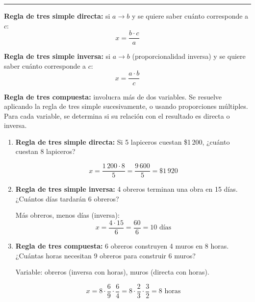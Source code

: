 \documentclass[11pt, letterpaper]{article}
\newcommand{\subbloque}[1]{%
  \vspace{14pt}
  \noindent{\large\bfseries\color{zenitnavy} #1}\par
  \vspace{4pt}\hrule height 1pt\vspace{8pt}}
\begin{document}
\subbloque{6.4 Regla de tres}
\label{sub:6.4}

\begin{tcolorbox}[importantbox, title={Regla de tres}]
\noindent\textbf{Regla de tres simple directa:} si $a \to b$ y se quiere saber cu\'anto corresponde a $c$:
$$x = \frac{b \cdot c}{a}$$

\medskip

\noindent\textbf{Regla de tres simple inversa:} si $a \to b$ (proporcionalidad inversa) y se quiere saber cu\'anto corresponde a $c$:
$$x = \frac{a \cdot b}{c}$$

\medskip

\noindent\textbf{Regla de tres compuesta:} involucra m\'as de dos variables. Se resuelve aplicando la regla de tres simple sucesivamente, o usando proporciones m\'ultiples. Para cada variable, se determina si su relaci\'on con el resultado es directa o inversa.
\end{tcolorbox}

\begin{tcolorbox}[examplebox, title={Ejemplos --- regla de tres}]
\begin{enumerate}[label=\textbf{Ej. \arabic*.}, leftmargin=*, itemsep=14pt]

\item \textbf{Regla de tres simple directa:} Si 5 lapiceros cuestan \$1\,200, ¿cu\'anto cuestan 8 lapiceros?

$$x = \frac{1\,200 \cdot 8}{5} = \frac{9\,600}{5} = \$1\,920$$

\item \textbf{Regla de tres simple inversa:} 4 obreros terminan una obra en 15 d\'ias. ¿Cu\'antos d\'ias tardar\'an 6 obreros?

M\'as obreros, menos d\'ias (inversa):
$$x = \frac{4 \cdot 15}{6} = \frac{60}{6} = 10 \text{ d\'ias}$$

\item \textbf{Regla de tres compuesta:} 6 obreros construyen 4 muros en 8 horas. ¿Cu\'antas horas necesitan 9 obreros para construir 6 muros?

\medskip

Variable: obreros (inversa con horas), muros (directa con horas).

$$x = 8 \cdot \frac{6}{9} \cdot \frac{6}{4} = 8 \cdot \frac{2}{3} \cdot \frac{3}{2} = 8 \text{ horas}$$

\end{enumerate}
\end{tcolorbox}
\end{document}
